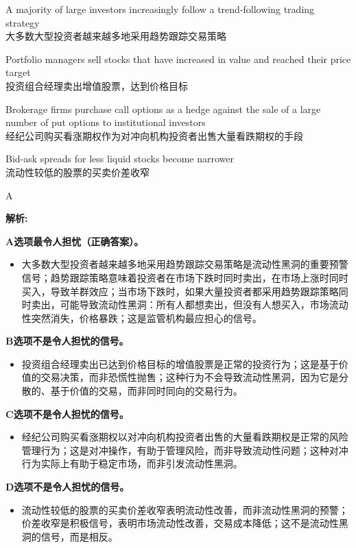 \documentclass{article}
\newenvironment{explanation}
{\textbf{解析:}\par}
{\par}
\begin{document}
\begin{choices}
    \item A majority of large investors increasingly follow a trend-following trading strategy\\
    大多数大型投资者越来越多地采用趋势跟踪交易策略
    \item Portfolio managers sell stocks that have increased in value and reached their price target\\
    投资组合经理卖出增值股票，达到价格目标
    \item Brokerage firms purchase call options as a hedge against the sale of a large number of put options to institutional investors\\
    经纪公司购买看涨期权作为对冲向机构投资者出售大量看跌期权的手段
    \item Bid-ask spreads for less liquid stocks become narrower\\
    流动性较低的股票的买卖价差收窄
\end{choices}

\begin{correctanswer}
    A
\end{correctanswer}

\begin{explanation}
    \textbf{A选项最令人担忧（正确答案）。}
    \begin{itemize}
        \item 大多数大型投资者越来越多地采用趋势跟踪交易策略是流动性黑洞的重要预警信号；趋势跟踪策略意味着投资者在市场下跌时同时卖出，在市场上涨时同时买入，导致羊群效应；当市场下跌时，如果大量投资者都采用趋势跟踪策略同时卖出，可能导致流动性黑洞：所有人都想卖出，但没有人想买入，市场流动性突然消失，价格暴跌；这是监管机构最应担心的信号。
    \end{itemize}

    \textbf{B选项不是令人担忧的信号。}
    \begin{itemize}
        \item 投资组合经理卖出已达到价格目标的增值股票是正常的投资行为；这是基于价值的交易决策，而非恐慌性抛售；这种行为不会导致流动性黑洞，因为它是分散的、基于价值的交易，而非同时同向的交易行为。
    \end{itemize}

    \textbf{C选项不是令人担忧的信号。}
    \begin{itemize}
        \item 经纪公司购买看涨期权以对冲向机构投资者出售的大量看跌期权是正常的风险管理行为；这是对冲操作，有助于管理风险，而非导致流动性问题；这种对冲行为实际上有助于稳定市场，而非引发流动性黑洞。
    \end{itemize}

    \textbf{D选项不是令人担忧的信号。}
    \begin{itemize}
        \item 流动性较低的股票的买卖价差收窄表明流动性改善，而非流动性黑洞的预警；价差收窄是积极信号，表明市场流动性改善，交易成本降低；这不是流动性黑洞的信号，而是相反。
    \end{itemize}
\end{explanation}
\end{document}
